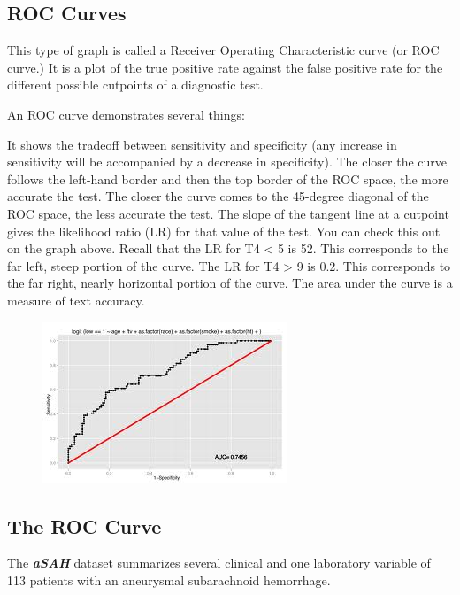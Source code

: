 \documentclass[caret-main.tex]{subfiles}
\begin{document}
\newpage
\subsection{ROC Curves}


This type of graph is called a Receiver Operating Characteristic curve (or ROC curve.) It is a plot of the true positive rate against the false positive rate for the different possible cutpoints of a diagnostic test.

An ROC curve demonstrates several things:

It shows the tradeoff between sensitivity and specificity (any increase in sensitivity will be accompanied by a decrease in specificity).
The closer the curve follows the left-hand border and then the top border of the ROC space, the more accurate the test.
The closer the curve comes to the 45-degree diagonal of the ROC space, the less accurate the test.
The slope of the tangent line at a cutpoint gives the likelihood ratio (LR) for that value of the test. You can check this out on the graph above. Recall that the LR for T4 < 5 is 52. This corresponds to the far left, steep portion of the curve. The LR for T4 > 9 is 0.2. This corresponds to the far right, nearly horizontal portion of the curve.
The area under the curve is a measure of text accuracy.

\newpage
\begin{figure}
\centering
\includegraphics[width=0.4\linewidth]{./ROCcurve}
\caption{}
\label{fig:ROCcurve}
\end{figure}


\subsection{The ROC Curve}
The \textbf{\textit{aSAH}} dataset summarizes several clinical and one laboratory variable of 113 patients with an aneurysmal subarachnoid hemorrhage.
\end{document}
